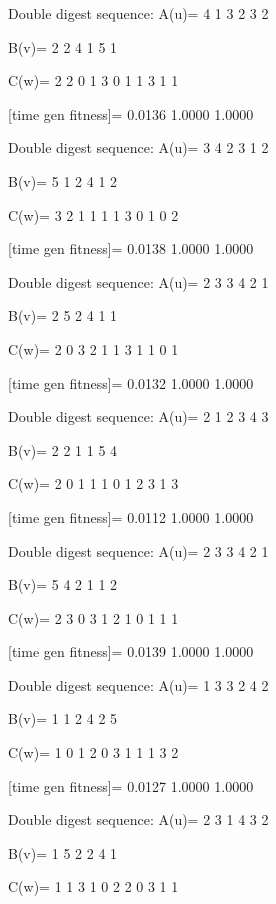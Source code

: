 Double digest sequence:
A(u)=
     4     1     3     2     3     2

B(v)=
     2     2     4     1     5     1

C(w)=
     2     2     0     1     3     0     1     1     3     1     1

[time gen fitness]=
    0.0136    1.0000    1.0000

Double digest sequence:
A(u)=
     3     4     2     3     1     2

B(v)=
     5     1     2     4     1     2

C(w)=
     3     2     1     1     1     1     3     0     1     0     2

[time gen fitness]=
    0.0138    1.0000    1.0000

Double digest sequence:
A(u)=
     2     3     3     4     2     1

B(v)=
     2     5     2     4     1     1

C(w)=
     2     0     3     2     1     1     3     1     1     0     1

[time gen fitness]=
    0.0132    1.0000    1.0000

Double digest sequence:
A(u)=
     2     1     2     3     4     3

B(v)=
     2     2     1     1     5     4

C(w)=
     2     0     1     1     1     0     1     2     3     1     3

[time gen fitness]=
    0.0112    1.0000    1.0000

Double digest sequence:
A(u)=
     2     3     3     4     2     1

B(v)=
     5     4     2     1     1     2

C(w)=
     2     3     0     3     1     2     1     0     1     1     1

[time gen fitness]=
    0.0139    1.0000    1.0000

Double digest sequence:
A(u)=
     1     3     3     2     4     2

B(v)=
     1     1     2     4     2     5

C(w)=
     1     0     1     2     0     3     1     1     1     3     2

[time gen fitness]=
    0.0127    1.0000    1.0000

Double digest sequence:
A(u)=
     2     3     1     4     3     2

B(v)=
     1     5     2     2     4     1

C(w)=
     1     1     3     1     0     2     2     0     3     1     1

